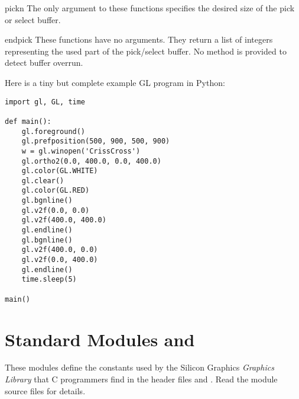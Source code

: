 \begin{funcdesc}{pick}{n}
The only argument to these functions specifies the desired size of the
pick or select buffer.
\end{funcdesc}

\begin{funcdesc}{endpick}{}
These functions have no arguments.
They return a list of integers representing the used part of the
pick/select buffer.
No method is provided to detect buffer overrun.
\end{funcdesc}

Here is a tiny but complete example GL program in Python:

\begin{verbatim}
import gl, GL, time

def main():
    gl.foreground()
    gl.prefposition(500, 900, 500, 900)
    w = gl.winopen('CrissCross')
    gl.ortho2(0.0, 400.0, 0.0, 400.0)
    gl.color(GL.WHITE)
    gl.clear()
    gl.color(GL.RED)
    gl.bgnline()
    gl.v2f(0.0, 0.0)
    gl.v2f(400.0, 400.0)
    gl.endline()
    gl.bgnline()
    gl.v2f(400.0, 0.0)
    gl.v2f(0.0, 400.0)
    gl.endline()
    time.sleep(5)

main()
\end{verbatim}
%
\section{Standard Modules  and }

These modules define the constants used by the Silicon Graphics
\emph{Graphics Library}
that C programmers find in the header files
and
.
Read the module source files for details.
